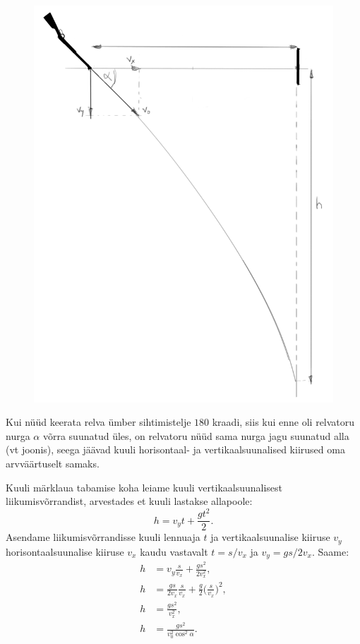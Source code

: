 \begingroup
\setlength{\columnsep}{1pt}
\begin{figure}
	\vspace{-20pt}
	\includegraphics[width = \linewidth]{2016-v2g-06-Lasketiir-2.PNG}
\end{figure}
Kui nüüd keerata relva ümber sihtimistelje $180$ kraadi, siis kui enne oli relvatoru nurga $\alpha$ võrra suunatud üles, on relvatoru nüüd sama nurga jagu suunatud alla (vt joonis), seega jäävad kuuli horisontaal- ja vertikaalsuunalised kiirused oma arvväärtuselt samaks.

Kuuli märklaua tabamise koha leiame kuuli vertikaalsuunalisest liikumisvõrrandist, arvestades et kuuli lastakse allapoole:
$$
h=v_{y}t+\frac{gt^2}{2}.
$$
Asendame liikumisvõrrandisse kuuli lennuaja $t$ ja vertikaalsuunalise kiiruse $v_y$ horisontaalsuunalise kiiruse $v_x$ kaudu vastavalt $t=s / v_x$ ja $v_y = gs/2v_x$. Saame:
\begin{align*}
h & = v_{y}\frac{s}{v_{x}}+\frac{gs^2}{2v_{x}^2},\\
h & = \frac{gs}{2v_x}\frac{s}{v_{x}}+\frac{g}{2}\Big(\frac{s}{v_{x}}\Big)^2,\\
h & = \frac{gs^2}{v_{x}^2},\\
h & = \frac{gs^2}{v_{0}^2\cos^2\alpha}.
\end{align*}
\endgroup

